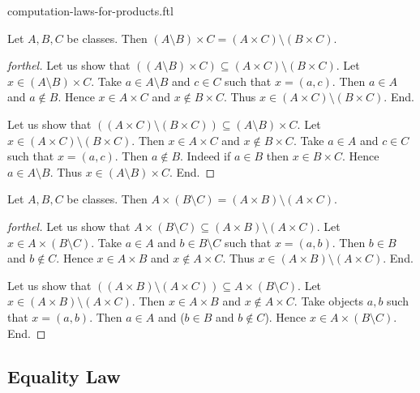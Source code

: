 \documentclass{naproche-library}
\begin{document}
\begin{smodule}{computation-laws-for-products.ftl}
  \begin{proposition}[forthel,id=FOUNDATIONS_05_6495329908162560]
    Let $A, B, C$ be classes.
    Then $(A \setminus B) \times C = (A \times C) \setminus (B \times C)$.
  \end{proposition}
  \begin{proof}[forthel]
    Let us show that $((A \setminus B) \times C) \subseteq (A \times C) \setminus (B \times C).$ %
      Let $x \in (A \setminus B) \times C$.
      Take $a \in A \setminus B$ and $c \in C$ such that $x = (a, c)$.
      Then $a \in A$ and $a \notin B$.
      Hence $x \in A \times C$ and $x \notin B \times C$.
      Thus $x \in (A \times C) \setminus (B \times C)$.
    End.

    Let us show that $((A \times C) \setminus (B \times C)) \subseteq (A \setminus B) \times C$. %
      Let $x \in (A \times C) \setminus (B \times C)$.
      Then $x \in A \times C$ and $x \notin B \times C$.
      Take $a \in A$ and $c \in C$ such that $x = (a, c)$.
      Then $a \notin B$.
      Indeed if $a \in B$ then $x \in B \times C$.
      Hence $a \in A \setminus B$.
      Thus $x \in (A \setminus B) \times C$.
    End.
  \end{proof}

  \begin{proposition}[forthel,id=FOUNDATIONS_05_3195639422779392]
    Let $A, B, C$ be classes.
    Then $A \times (B \setminus C) = (A \times B) \setminus (A \times C)$.
  \end{proposition}
  \begin{proof}[forthel]
    Let us show that $A \times (B \setminus C) \subseteq (A \times B) \setminus (A \times C)$.
      Let $x \in A \times (B \setminus C)$.
      Take $a \in A$ and $b \in B \setminus C$ such that $x = (a, b)$.
      Then $b \in B$ and $b \notin C$.
      Hence $x \in A \times B$ and $x \notin A \times C$.
      Thus $x \in (A \times B) \setminus (A \times C)$.
    End.

    Let us show that $((A \times B) \setminus (A \times C)) \subseteq A \times (B \setminus C)$. %
      Let $x \in (A \times B) \setminus (A \times C)$.
      Then $x \in A \times B$ and $x \notin A \times C$.
      Take objects $a, b$ such that $x = (a, b)$.
      Then $a \in A$ and ($b \in B$ and $b \notin C$).
      Hence $x \in A \times (B \setminus C)$.
    End.
  \end{proof}


  \subsection*{Equality Law}


\end{smodule}
\end{document}

